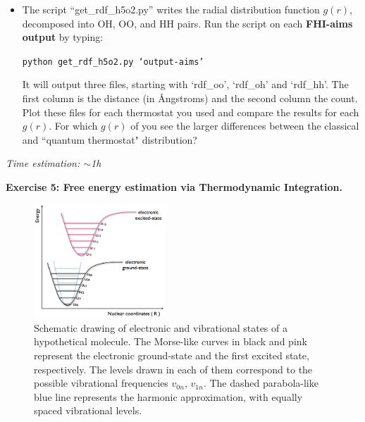 \documentclass[a4paper,11pt]{scrartcl}
\begin{document}
\begin{itemize}
\item The script ``get\_rdf\_h5o2.py'' writes the radial distribution function $g(r)$, decomposed into OH, OO, and HH pairs. Run the script on each \textbf{FHI-aims output} by typing:

\texttt{python get\_rdf\_h5o2.py  `output-aims'}

It will output three files, starting with `rdf\_oo', `rdf\_oh' and `rdf\_hh'. The first column is the distance (in \AA ngstroms) and the second column the count. Plot these files for each thermostat you used and compare the results for each $g(r)$.
For which $g(r)$ of you see the larger differences between the classical and ``quantum thermostat" distribution?


\end{itemize}


\textit{Time estimation: $\sim$1h}

\newpage
{\large\textbf{Exercise 5: Free energy estimation via Thermodynamic Integration.}}


\begin{figure}
\begin{center}
\includegraphics[width=0.44\textwidth]{vibrations_pic.png}
\caption{Schematic drawing of electronic and vibrational states of a hypothetical molecule. The Morse-like curves in black and pink represent the electronic
ground-state and the first excited state, respectively. The levels drawn in each of them correspond to the possible vibrational frequencies $v_{0n}$, $v_{1n}$.
The dashed parabola-like blue line represents the harmonic approximation, with equally spaced vibrational levels. \label{fig:vibs}}
\end{center}
\end{figure}
\end{document}
